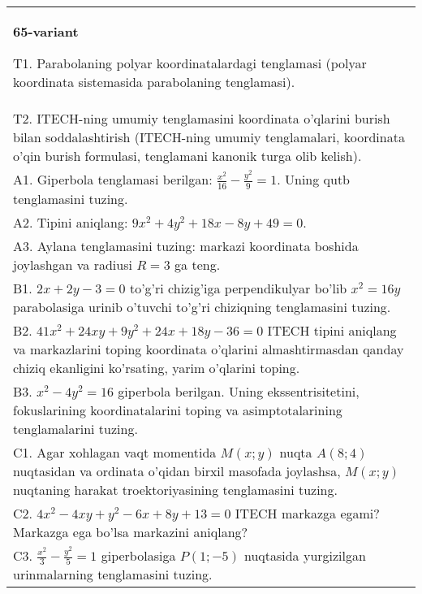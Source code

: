 \documentclass{article}
\begin{document}
\begin{tabular}{m{17cm}}
\textbf{65-variant}
\newline

T1. Parabolaning polyar koordinatalardagi tenglamasi (polyar koordinata sistemasida parabolaning tenglamasi).\\

T2. ITECH-ning umumiy tenglamasini koordinata o'qlarini burish bilan soddalashtirish (ITECH-ning umumiy tenglamalari, koordinata o'qin burish formulasi, tenglamani kanonik turga olib kelish).\\

A1. Giperbola tenglamasi berilgan: $\frac{x^{2}}{16}-\frac{y^{2}}{9}=1$. Uning qutb tenglamasini tuzing.\\

A2. Tipini aniqlang: $9x^{2}+4y^{2}+18x-8y+49=0$.\\

A3. Aylana tenglamasini tuzing: markazi koordinata boshida joylashgan va radiusi $R=3$ ga teng.\\

B1. $2x + 2y - 3 = 0$ to'g'ri chizig'iga perpendikulyar bo'lib $x^{2} = 16y$ parabolasiga urinib o'tuvchi to'g'ri chiziqning tenglamasini tuzing.  \\

B2. $41x^{2} + 24xy + 9y^{2} + 24x + 18y - 36 = 0$ ITECH tipini aniqlang va markazlarini toping koordinata o'qlarini almashtirmasdan qanday chiziq ekanligini ko'rsating, yarim o'qlarini toping.  \\

B3. $x^{2} - 4y^{2} = 16$ giperbola berilgan. Uning ekssentrisitetini, fokuslarining koordinatalarini toping va asimptotalarining tenglamalarini tuzing.\\

C1. Agar xohlagan vaqt momentida $M(x;y)$ nuqta $A(8;4)$ nuqtasidan va ordinata o'qidan birxil masofada joylashsa, $M(x;y)$ nuqtaning harakat troektoriyasining tenglamasini tuzing.  \\

C2. $4x^{2} - 4xy + y^{2} - 6x + 8y + 13 = 0$ ITECH markazga egami? Markazga ega bo'lsa markazini aniqlang?  \\

C3. $\frac{x^{2}}{3} - \frac{y^{2}}{5} = 1$ giperbolasiga $P(1; - 5)$ nuqtasida yurgizilgan urinmalarning tenglamasini tuzing.\\

\end{tabular}
\vspace{1cm}
\end{document}
